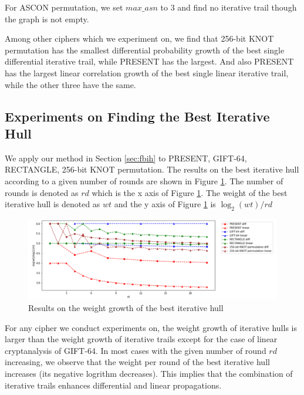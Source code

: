 For ASCON permutation, we set $max\_asn$ to 3 and find no iterative trail though the graph is not empty. 

Among other ciphers which we experiment on, we find that 256-bit KNOT permutation has the smallest differential probability growth of the best single differential iterative trail, while PRESENT has the largest. And also PRESENT has the largest linear correlation growth of the best single linear iterative trail, while the other three have the same. 

\subsection{Experiments on Finding the Best Iterative Hull}

We apply our method in Section \ref{sec:fbih} to PRESENT, GIFT-64, RECTANGLE, 256-bit KNOT permutation. The results on the best iterative hull according to a given number of rounds are shown in Figure \ref{fig:plot_ih}. The number of rounds is denoted as $rd$ which is the x axis of Figure \ref{fig:plot_ih}. The weight of the best iterative hull is denoted as $wt$ and the y axis of Figure \ref{fig:plot_ih} is $\log_2(wt)/rd$

\begin{figure}
	\centering
	\includegraphics[width=1\textwidth]{fig/plot_iterative_hulls.PNG}
	\caption{Results on the weight growth of the best iterative hull} \label{fig:plot_ih}
\end{figure}

For any cipher we conduct experiments on, the weight growth of iterative hulls is larger than the weight growth of iterative trails except for the case of linear cryptanalysis of GIFT-64. In most cases with the given number of round $rd$ increasing, we observe that the weight per round of the best iterative hull increases (its negative logrithm decreases). This implies that the combination of iterative trails enhances differential and linear propagations. 



